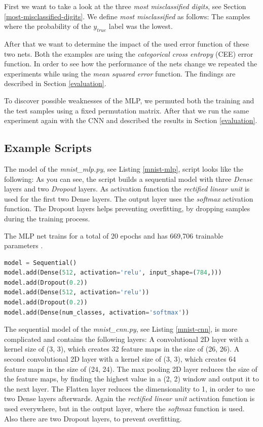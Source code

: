 \documentclass{article}[]
\begin{document}
First we want to take a look at the three \emph{most misclassified digits}, see Section \ref{most-misclassified-digits}.
We define \textit{most misclassified} as follows: The samples where the probability of the $y_{true}$ label was the lowest.

After that we want to determine the impact of the used error function of these two nets.
Both the examples are using the \emph{categorical cross entropy} (CEE) error function.
In order to see how the performance of the nets change we repeated the experiments while using the \emph{mean squared error} function.
The findings are described in Section \ref{evaluation}.

To discover possible weaknesses of the MLP, we permuted both the training and the test samples using a fixed permutation matrix.
After that we run the same experiment again with the CNN and described the results in Section \ref{evaluation}.


\subsection{Example Scripts}
\label{example-scripts}

The model of the \emph{mnist\_mlp.py}, see Listing \ref{mnist-mlp}, script looks like the following:
As you can see, the script builds a sequential model with three \emph{Dense} layers and two \emph{Dropout} layers.
As activation function the \emph{rectified linear unit} is used for the first two Dense layers.
The output layer uses the \emph{softmax} activation function.
The Dropout layers helps preventing overfitting, by dropping samples during the training process.

The MLP net trains for a total of 20 epochs and has 669,706 trainable parameters .

\begin{lstlisting}[language=Python, label=mnist-mlp, caption={mnist\_cnn.py model}, captionpos=b]
model = Sequential()
model.add(Dense(512, activation='relu', input_shape=(784,)))
model.add(Dropout(0.2))
model.add(Dense(512, activation='relu'))
model.add(Dropout(0.2))
model.add(Dense(num_classes, activation='softmax'))
\end{lstlisting}

The sequential model of the \emph{mnist\_cnn.py}, see Listing \ref{mnist-cnn}, is more complicated and contains the following layers:
A convolutional 2D layer with a kernel size of (3, 3), which creates 32 feature maps in the size of (26, 26).
A second convolutional 2D layer with a kernel size of (3, 3), which creates 64 feature maps in the size of (24, 24).
The max pooling 2D layer reduces the size of the feature maps, by finding the highest value in a (2, 2) window and output it to the next layer.
The Flatten layer reduces the dimensionality to 1, in order to use two Dense layers afterwards.
Again the \emph{rectified linear unit} activation function is used everywhere, but in the output layer, where the \emph{softmax} function is used.
Also there are two Dropout layers, to prevent overfitting.
\end{document}
